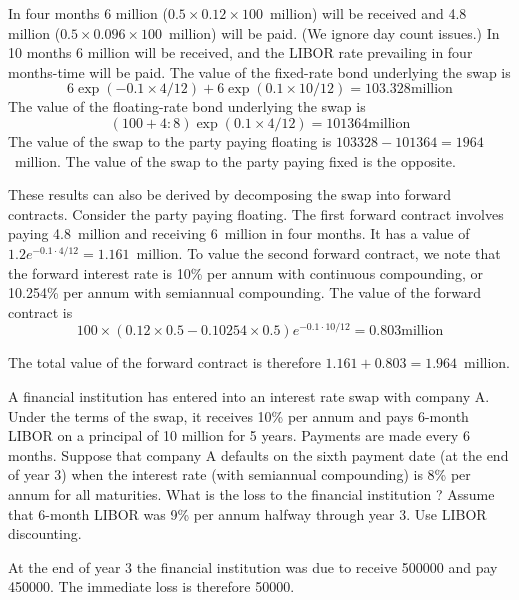 \documentclass[12pt,a4paper]{exam}
\begin{document}
\begin{questions}
\begin{solution}
In four months 6 million ($0.5\times 0.12\times 100$~million) will be received and 4.8 million ($0.5\times 0.096\times 100$~million) will be paid. (We ignore day count issues.) In 10 months 6 million will be received, and the LIBOR rate prevailing in four months-time will be paid. The value of the fixed-rate bond underlying the swap is
\begin{equation*}
6 \exp(-0.1 \times 4/12) + 6 \exp(0.1\times  10/12) = 103.328 \text{million}
\end{equation*}
The value of the floating-rate bond underlying the swap is 
\begin{equation*}
(100 + 4:8) \exp(0.1\times  4/12) = 101364 \text{million}
\end{equation*}
The value of the swap to the party paying floating is $103328-  101364 = 1964$~million. 
The value of the swap to the party paying fixed is the opposite. 

These results can also be derived by decomposing the swap into forward contracts. Consider the party paying floating. The first forward contract involves paying 4.8~million and receiving 6~million in four months. It has a value of $1.2e^{-0.1\cdot 4/12} = 1.161$~million.
To value the second forward contract, we note that the forward interest rate is 10\% per annum with continuous compounding, or 10.254\% per annum with semiannual compounding. The value of the forward contract is
\begin{equation*}
100\times  (0.12\times 0.5-0.10254\times 0.5)e^{-0.1\cdot 10/12} = 0.803 \text{million}
\end{equation*}

The total value of the forward contract is therefore $1.161 + 0.803 = 1.964$~million.

\question  A financial institution has entered into an interest rate swap with company A. Under the terms of the swap, it receives 10\% per annum and pays 6-month LIBOR on a principal of 10 million for 5 years. Payments are made every 6 months. 
Suppose that company A defaults on the sixth payment date (at the end of year 3) when the interest rate (with semiannual compounding) is 8\% per annum for all maturities. 
What is the loss to the financial institution ? Assume that 6-month LIBOR was 9\% per annum halfway through year 3. 
Use LIBOR discounting.

\begin{solution}
At the end of year 3 the financial institution was due to receive 500000 and pay 450000. The immediate loss is therefore 50000.


\end{solution}
\end{solution}
\end{questions}
\end{document}
